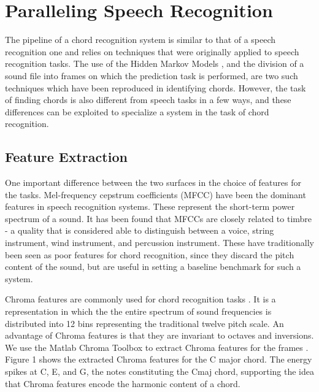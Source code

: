 \documentclass{article}
\begin{document}
\section{Paralleling Speech Recognition}

The pipeline of a chord recognition system is similar to that of a speech
recognition one and relies on techniques that were originally applied to speech
recognition tasks. The use of the Hidden Markov Models \cite{young} , and the
division of a sound file into frames on which the prediction task is performed,
are two such techniques which have been reproduced in identifying chords.
However, the task of finding chords is also different from speech tasks in a few
ways, and these differences can be exploited to specialize a system in the task
of chord recognition.

\subsection{Feature Extraction}

One important difference between the two surfaces in the choice of features for
the tasks. Mel-frequency cepstrum coefficients (MFCC) have been the dominant
features in speech recognition systems. These represent the short-term
power spectrum of a sound. It has been found that MFCCs are closely related to
timbre - a quality that is considered able to distinguish between a voice,
string instrument, wind instrument, and percussion instrument. These have
traditionally been seen as poor features for chord recognition, since they
discard the pitch content of the sound, but are useful in setting a baseline
benchmark for such a system.

Chroma features are commonly used for chord recognition tasks \cite{fujishima}.
It is a representation in which the the entire spectrum of sound frequencies is
distributed into 12 bins representing the traditional twelve pitch scale. An
advantage of Chroma features is that they are invariant to octaves and inversions.
We use the Matlab Chroma Toolbox to extract Chroma features for the frames
\cite{muller}. Figure 1 shows the extracted Chroma features for the C major
chord. The energy spikes at C, E, and G, the notes constituting the Cmaj chord,
supporting the idea that Chroma features encode the harmonic content of a chord.
\end{document}
